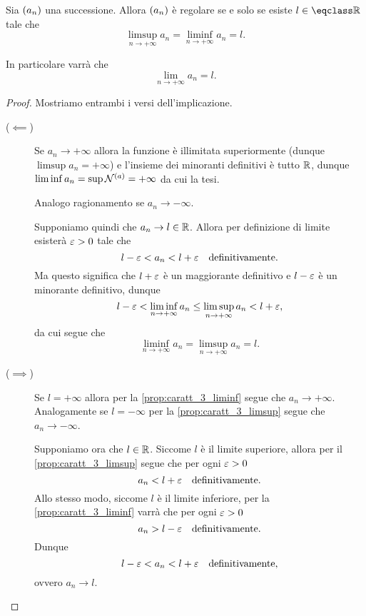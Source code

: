 \begin{theorem}
    Sia $\seqn*{a}$ una successione. Allora $\seqn*{a}$ è regolare se e solo se esiste $l \in \closure{\R}$ tale che \[
        \limsup_{n \to +\infty} a_n = \liminf_{n \to +\infty} a_n = l.   
    \]

    In particolare varrà che \[
        \lim_{n \to +\infty} a_n = l.
    \]
\end{theorem}
\begin{proof}
    Mostriamo entrambi i versi dell'implicazione.
    \begin{description}
        \item[($\impliedby$)] Se $a_n \to +\infty$ allora la funzione è illimitata superiormente (dunque $\limsup a_n = +\infty$) e l'insieme dei minoranti definitivi è tutto $\mathbb{R}$, dunque $\liminf a_n = \sup \mathcal{N}^{(a)} = +\infty$ da cui la tesi.
        
        Analogo ragionamento se $a_n \to -\infty$.

        Supponiamo quindi che $a_n \to l \in \mathbb{R}$. Allora per definizione di limite esisterà $\varepsilon > 0$ tale che \[
            l - \varepsilon < a_n < l + \varepsilon \quad \text{definitivamente.}    
        \] Ma questo significa che $l + \varepsilon$ è un maggiorante definitivo e $l - \varepsilon$ è un minorante definitivo, dunque \[
            l - \varepsilon < \liminf_{n \to +\infty} a_n \leq \limsup_{n \to +\infty} a_n < l + \varepsilon,
        \] da cui segue che \[
            \liminf_{n \to +\infty} a_n = \limsup_{n \to +\infty} a_n = l.
        \]
        \item[($\implies$)] Se $l = +\infty$ allora per la \autoref{prop:caratt_3_liminf} segue che $a_n \to +\infty$. Analogamente se $l = -\infty$ per la \autoref{prop:caratt_3_limsup} segue che $a_n \to -\infty$.
        
        Supponiamo ora che $l \in \mathbb{R}$. Siccome $l$ è il limite superiore, allora per il \autoref{prop:caratt_3_limsup} segue che per ogni $\varepsilon > 0$ \[
            a_n < l + \varepsilon \quad \text{definitivamente.}
        \] Allo stesso modo, siccome $l$ è il limite inferiore, per la \autoref{prop:caratt_3_liminf} varrà che  per ogni $\varepsilon > 0$ \[
            a_n > l - \varepsilon \quad \text{definitivamente.}    
        \] Dunque \[
            l - \varepsilon < a_n < l + \varepsilon \quad \text{definitivamente,}    
        \] ovvero $a_n \to l$. \qedhere
    \end{description}
\end{proof}

